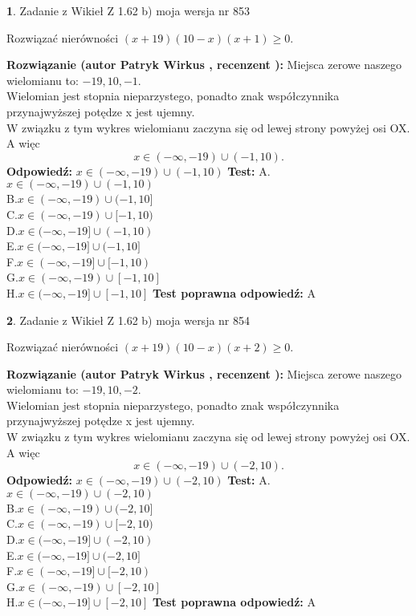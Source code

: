 \documentclass[12pt, a4paper]{article}
\theoremstyle{definition} %
\newtheorem{zad}{}
\newcommand{\zadStart}[1]{\begin{zad}#1\newline}
\newcommand{\zadStop}{\end{zad}}
\newcommand{\rozwStart}[2]{\noindent \textbf{Rozwiązanie (autor #1 , recenzent #2): }\newline}
\newcommand{\rozwStop}{\newline}
\newcommand{\odpStart}{\noindent \textbf{Odpowiedź:}\newline}
\newcommand{\odpStop}{\newline}
\newcommand{\testStart}{\noindent \textbf{Test:}\newline}
\newcommand{\testStop}{\newline}
\newcommand{\kluczStart}{\noindent \textbf{Test poprawna odpowiedź:}\newline}
\newcommand{\kluczStop}{\newline}
\begin{document}
\zadStart{Zadanie z Wikieł Z 1.62 b) moja wersja nr 853}

Rozwiązać nierówności $(x+19)(10-x)(x+1)\ge0$.
\zadStop
\rozwStart{Patryk Wirkus}{}
Miejsca zerowe naszego wielomianu to: $-19, 10, -1$.\\
Wielomian jest stopnia nieparzystego, ponadto znak współczynnika przy\linebreak najwyższej potędze x jest ujemny.\\ W związku z tym wykres wielomianu zaczyna się od lewej strony powyżej osi OX. A więc $$x \in (-\infty,-19) \cup (-1,10).$$
\rozwStop
\odpStart
$x \in (-\infty,-19) \cup (-1,10)$
\odpStop
\testStart
A.$x \in (-\infty,-19) \cup (-1,10)$\\
B.$x \in (-\infty,-19) \cup (-1,10]$\\
C.$x \in (-\infty,-19) \cup [-1,10)$\\
D.$x \in (-\infty,-19] \cup (-1,10)$\\
E.$x \in (-\infty,-19] \cup (-1,10]$\\
F.$x \in (-\infty,-19] \cup [-1,10)$\\
G.$x \in (-\infty,-19) \cup [-1,10]$\\
H.$x \in (-\infty,-19] \cup [-1,10]$
\testStop
\kluczStart
A
\kluczStop



\zadStart{Zadanie z Wikieł Z 1.62 b) moja wersja nr 854}

Rozwiązać nierówności $(x+19)(10-x)(x+2)\ge0$.
\zadStop
\rozwStart{Patryk Wirkus}{}
Miejsca zerowe naszego wielomianu to: $-19, 10, -2$.\\
Wielomian jest stopnia nieparzystego, ponadto znak współczynnika przy\linebreak najwyższej potędze x jest ujemny.\\ W związku z tym wykres wielomianu zaczyna się od lewej strony powyżej osi OX. A więc $$x \in (-\infty,-19) \cup (-2,10).$$
\rozwStop
\odpStart
$x \in (-\infty,-19) \cup (-2,10)$
\odpStop
\testStart
A.$x \in (-\infty,-19) \cup (-2,10)$\\
B.$x \in (-\infty,-19) \cup (-2,10]$\\
C.$x \in (-\infty,-19) \cup [-2,10)$\\
D.$x \in (-\infty,-19] \cup (-2,10)$\\
E.$x \in (-\infty,-19] \cup (-2,10]$\\
F.$x \in (-\infty,-19] \cup [-2,10)$\\
G.$x \in (-\infty,-19) \cup [-2,10]$\\
H.$x \in (-\infty,-19] \cup [-2,10]$
\testStop
\kluczStart
A
\kluczStop
\end{document}
